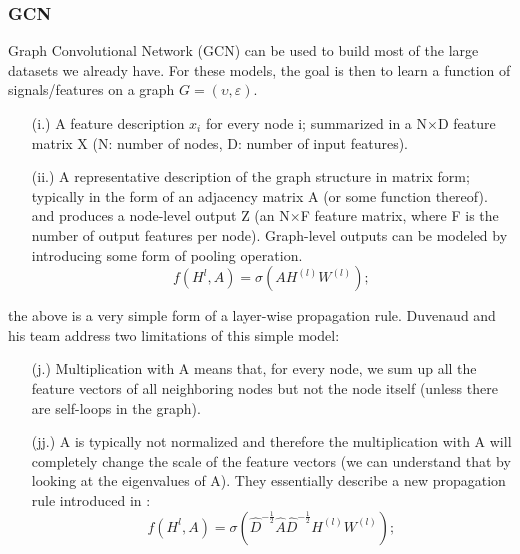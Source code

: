 \subsubsection{GCN}
Graph Convolutional Network (GCN) can be used to build most of the large datasets we already have. For these models, the goal is then to learn a function of signals/features on a graph $ G=(\upsilon ,\varepsilon ) $.\\
\begin{itemize}
\item[(i.)] A feature description $x_{i}$ for every node i; summarized in a N$\times$D feature matrix X (N: number of nodes, D: number of input features).
\item[(ii.)] A representative description of the graph structure in matrix form; typically in the form of an adjacency matrix A (or some function thereof).
and produces a node-level output Z (an N$\times$F feature matrix, where F is the number of output features per node). Graph-level outputs can be modeled by introducing some form of pooling operation. \cite{duvenaud2015convolutional}
\[
f(H^{l},A) = \sigma (AH^{(l)}W^{(l)});
\]
\end{itemize}
the above is a very simple form of a layer-wise propagation rule. Duvenaud and his team \cite{duvenaud2015convolutional} address two limitations of this simple model: 
\begin{itemize}
\item[(j.)] Multiplication with A means that, for every node, we sum up all the feature vectors of all neighboring nodes but not the node itself (unless there are self-loops in the graph).
\item[(jj.)] A  is typically not normalized and therefore the multiplication with A will completely change the scale of the feature vectors (we can understand that by looking at the eigenvalues of A).
They essentially describe a new propagation rule introduced in \cite{kipf2016semi}:
\[
f(H^{l},A) = \sigma (\hat{D}^{-\frac{1}{2}} \hat{A}\hat{D}^{-\frac{1}{2}}H^{ (l) }W^{ (l) }) ;
\]
\end{itemize}

